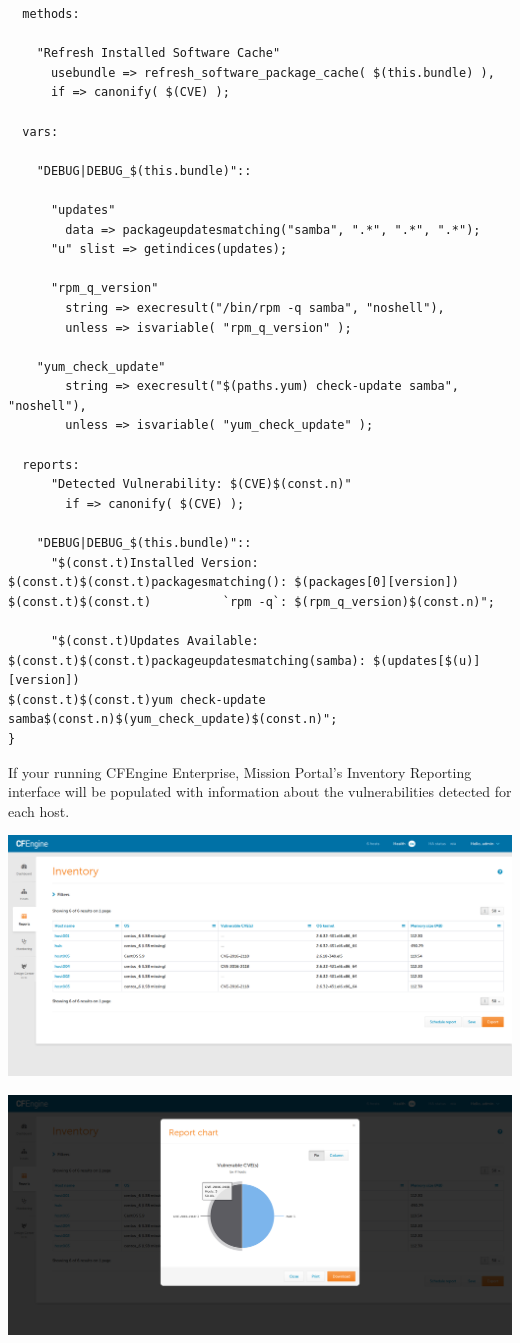 \documentclass[11pt]{article}
\begin{document}
\begin{verbatim}
  methods:

    "Refresh Installed Software Cache"
      usebundle => refresh_software_package_cache( $(this.bundle) ),
      if => canonify( $(CVE) );

  vars:

    "DEBUG|DEBUG_$(this.bundle)"::

      "updates"
        data => packageupdatesmatching("samba", ".*", ".*", ".*");
      "u" slist => getindices(updates);

      "rpm_q_version"
        string => execresult("/bin/rpm -q samba", "noshell"),
        unless => isvariable( "rpm_q_version" );

    "yum_check_update"
        string => execresult("$(paths.yum) check-update samba", "noshell"),
        unless => isvariable( "yum_check_update" );

  reports:
      "Detected Vulnerability: $(CVE)$(const.n)"
        if => canonify( $(CVE) );

    "DEBUG|DEBUG_$(this.bundle)"::
      "$(const.t)Installed Version:
$(const.t)$(const.t)packagesmatching(): $(packages[0][version])
$(const.t)$(const.t)          `rpm -q`: $(rpm_q_version)$(const.n)";

      "$(const.t)Updates Available:
$(const.t)$(const.t)packageupdatesmatching(samba): $(updates[$(u)][version])
$(const.t)$(const.t)yum check-update samba$(const.n)$(yum_check_update)$(const.n)";
}
\end{verbatim}

If your running CFEngine Enterprise, Mission Portal's Inventory Reporting
interface will be populated with information about the vulnerabilities detected
for each host.

\includegraphics[width=.9\linewidth]{../media/inventory_report_vulnerable_cves.png}

\includegraphics[width=.9\linewidth]{../media/inventory_report_vulnerable_cves_chart.png}
\end{document}
